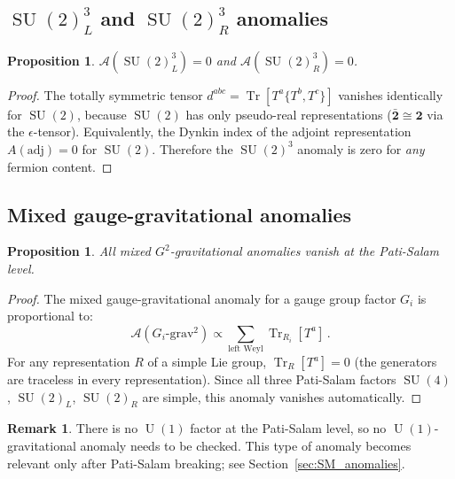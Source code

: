 \documentclass[12pt,a4paper]{article}
\newtheorem{proposition}[theorem]{Proposition}
\theoremstyle{definition}
\newtheorem{remark}[theorem]{Remark}
\newcommand{\Tr}{\operatorname{Tr}}
\newcommand{\SU}{\operatorname{SU}}
\newcommand{\U}{\operatorname{U}}
\begin{document}
\subsection{\texorpdfstring{$\SU(2)_L^3$}{SU(2)L³} and \texorpdfstring{$\SU(2)_R^3$}{SU(2)R³} anomalies}

\begin{proposition}
\label{prop:su2_anomaly}
$\mathcal{A}(\SU(2)_L^3) = 0$ and $\mathcal{A}(\SU(2)_R^3) = 0$.
\end{proposition}

\begin{proof}
The totally symmetric tensor $d^{abc} = \Tr[T^a \{T^b, T^c\}]$ vanishes identically for $\SU(2)$, because $\SU(2)$ has only pseudo-real representations ($\bar{\mathbf{2}} \cong \mathbf{2}$ via the $\epsilon$-tensor).
Equivalently, the Dynkin index of the adjoint representation $A(\mathrm{adj}) = 0$ for $\SU(2)$.
Therefore the $\SU(2)^3$ anomaly is zero for \emph{any} fermion content.
\end{proof}

\subsection{Mixed gauge-gravitational anomalies}

\begin{proposition}
\label{prop:mixed_grav}
All mixed $G^2$-gravitational anomalies vanish at the Pati-Salam level.
\end{proposition}

\begin{proof}
The mixed gauge-gravitational anomaly for a gauge group factor $G_i$ is proportional to:
\begin{equation}
\mathcal{A}(G_i\text{-grav}^2) \propto \sum_{\text{left Weyl}} \Tr_{R_i}[T^a]\,.
\end{equation}
For any representation $R$ of a simple Lie group, $\Tr_R[T^a] = 0$ (the generators are traceless in every representation).
Since all three Pati-Salam factors $\SU(4)$, $\SU(2)_L$, $\SU(2)_R$ are simple, this anomaly vanishes automatically.
\end{proof}

\begin{remark}
There is no $\U(1)$ factor at the Pati-Salam level, so no $\U(1)$-gravitational anomaly needs to be checked.
This type of anomaly becomes relevant only after Pati-Salam breaking; see Section~\ref{sec:SM_anomalies}.
\end{remark}
\end{document}
